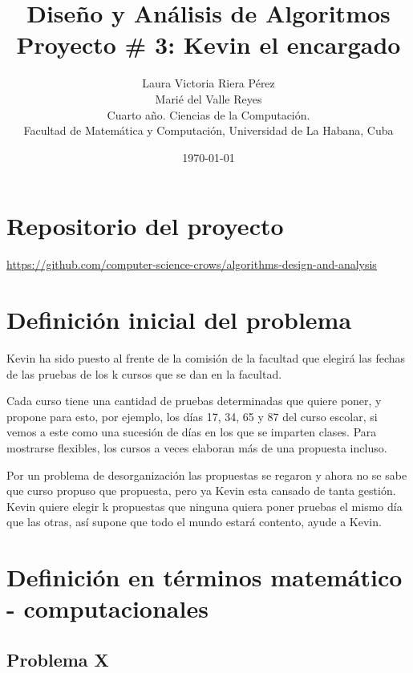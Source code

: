 \documentclass[10pt]{article} %
\title{\normalsize{Dise\~no y An\'alisis de Algoritmos }\\
	\Huge\bfseries Proyecto \# 3: Kevin el encargado \\
} %
\author{%
	Laura Victoria Riera P\'erez\\
	Mari\'e del Valle Reyes \vspace{1em} \\
	\small Cuarto a\~no. Ciencias de la Computaci\'on. \\ %
	\small Facultad de Matem\'atica y Computaci\'on, Universidad de La Habana, Cuba \\ %
}
\date{\footnotesize \today } %
\begin{document}
	\maketitle
	
	
	\section{Repositorio del proyecto}
	
	\begin{center}
		\href{https://github.com/computer-science-crows/algorithms-design-and-analysis}{https://github.com/computer-science-crows/algorithms-design-and-analysis}
	\end{center}

	\section{Definici\'on inicial del problema} 

	Kevin ha sido puesto al frente de la comisión de la facultad que elegirá las fechas de las pruebas de los k cursos que se dan en la facultad.
	
	Cada curso tiene una cantidad de pruebas determinadas que quiere poner, y propone para esto, por ejemplo, los días { 17, 34, 65 y 87 } del curso escolar, si vemos a este como una sucesión de días en los que se imparten clases. Para mostrarse flexibles, los cursos a veces elaboran más de una propuesta incluso.
	
	Por un problema de desorganización las propuestas se regaron y ahora no se sabe que curso propuso que propuesta, pero ya Kevin esta cansado de tanta gestión. Kevin quiere elegir k propuestas que ninguna quiera poner pruebas el mismo día que las otras, así supone que todo el mundo estará contento, ayude a Kevin.
	

	\section{Definici\'on en t\'erminos matem\'atico - computacionales}\label{section_2}
	
	
	\subsection{Problema X}
\end{document}
